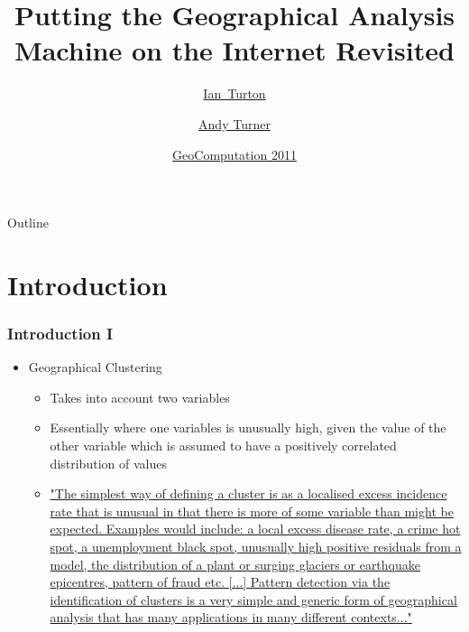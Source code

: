 \documentclass{beamer}
\title[GAM Revisited] %
{Putting the Geographical Analysis Machine on the Internet Revisited}
\author[Turton, Turner] %
{\href{http://www.ccg.leeds.ac.uk/people/i.turton/}{Ian~Turton\inst{1}} \and \href{http://www.geog.leeds.ac.uk/people/a.turner/}{Andy Turner}\inst{2}}
\institute[ ] %
{
  \inst{1}%
Independent Researcher\\
  ijturton@gmail.com
  \and
  \inst{2}%
  \href{http://www.ccg.leeds.ac.uk/}{Centre for Computational Geography}\\
  \href{http://www.leeds.ac.uk/}{University of Leeds}\\
  A.G.D.Turner@leeds.ac.uk}
\date[ ] %
{\href{http://standard.cege.ucl.ac.uk/workshops/Geocomputation/}{GeoComputation 2011}}
\begin{document}
\begin{frame}
  \titlepage
\end{frame}


\begin{frame}{Outline}
  \tableofcontents
\end{frame}


\section{Introduction}

\begin{frame}[t]
\frametitle{Introduction I}
\begin{itemize}
  \item Geographical Clustering
  \begin{itemize}
    \item Takes into account two variables 
    \item Essentially where one variables is unusually high, given the value of the other variable which is assumed to have a positively correlated distribution of values
    \item \href{http://web.archive.org/web/20040316070705/http://www.ccg.leeds.ac.uk/smart/gam/gam3.html}{"The simplest way of defining a cluster is as a localised excess incidence rate that is unusual in that there is more of some variable than might be expected. Examples would include: a local excess disease rate, a crime hot spot, a unemployment black spot, unusually high positive residuals from a model, the distribution of a plant or surging glaciers or earthquake epicentres, pattern of fraud etc. [...] Pattern detection via the identification of clusters is a very simple and generic form of geographical analysis that has many applications in many different contexts..."}
  \end{itemize}
\end{itemize}
\end{frame}
\end{document}
